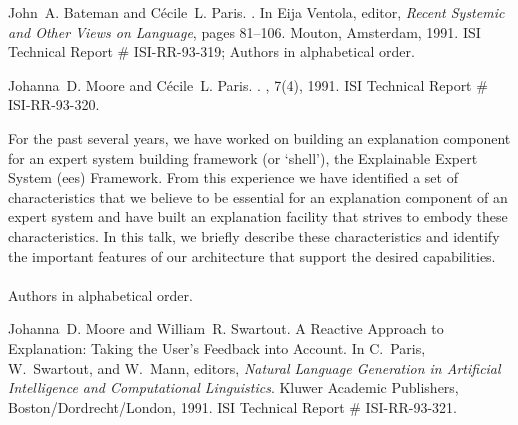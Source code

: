 \begin{thebibliography}{10}
John~A. Bateman and C\'ecile~L. Paris.
.
\newblock In Eija Ventola, editor, {\em Recent Systemic and Other Views on
  Language}, pages 81--106. Mouton, Amsterdam, 1991.
\newblock ISI Technical Report \# ISI-RR-93-319; Authors in alphabetical order.

\noindent\hspace*{\itemindent}{\leftskip=0.1in\rightskip=0.1in\hrulefill}

Johanna~D. Moore and C\'{e}cile~L. Paris.
.
, 7(4), 1991.
\newblock ISI Technical Report \# ISI-RR-93-320.

{\leftskip=0.1in\rightskip=0.1in\begin{small}\par{}For
  the past several years, we have worked on building an explanation component
  for an expert system building framework (or `shell'), the Explainable Expert
  System ({\sc ees}) Framework. From this experience we have identified a set
  of characteristics that we believe to be essential for an explanation
  component of an expert system and have built an explanation facility that
  strives to embody these characteristics. In this talk, we briefly describe
  these characteristics and identify the important features of our architecture
  that support the desired capabilities. \\ \\ Authors in alphabetical
  order.\end{small}\par}
\noindent\hspace*{\itemindent}{\leftskip=0.1in\rightskip=0.1in\hrulefill}

Johanna~D. Moore and William~R. Swartout.
\newblock A {R}eactive {A}pproach to {E}xplanation: {T}aking the {U}ser's
  {F}eedback into {A}ccount.
\newblock In C.~Paris, W.~Swartout, and W.~Mann, editors, {\em Natural Language
  Generation in Artificial Intelligence and Computational Linguistics}. Kluwer
  Academic Publishers, Boston/Dordrecht/London, 1991.
\newblock ISI Technical Report \# ISI-RR-93-321.


\end{thebibliography}

